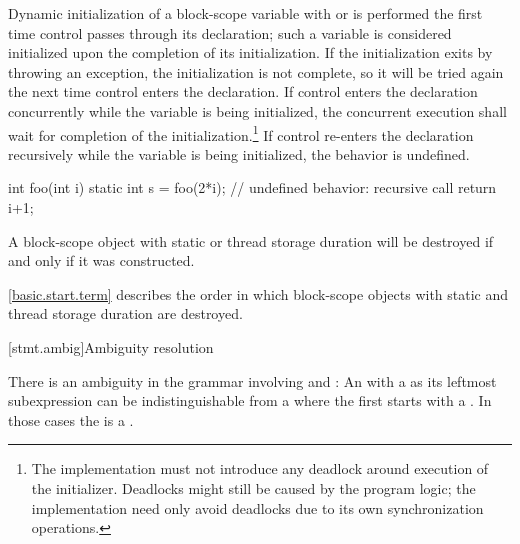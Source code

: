 \pnum
{}%
%
%
%
Dynamic initialization of a block-scope variable with
 or
 is performed
the first time control passes through its declaration; such a variable is
considered initialized upon the completion of its initialization. If the
initialization exits by throwing an exception, the initialization is not
complete, so it will be tried again the next time control enters the
declaration.
If control enters the declaration concurrently while the variable is
being initialized, the concurrent execution shall wait for completion
of the initialization.\footnote{The implementation must not introduce
any deadlock around execution of the initializer. Deadlocks might
still be caused by the program logic; the implementation need only
avoid deadlocks due to its own synchronization operations.} If control
re-enters the declaration recursively while
the variable is being initialized, the behavior is undefined.
\begin{example}
\begin{codeblock}
int foo(int i) {
  static int s = foo(2*i);      // undefined behavior: recursive call
  return i+1;
}
\end{codeblock}
\end{example}

\pnum
{}%
A block-scope object with static or thread storage duration will be
destroyed if and only if it was constructed.
\begin{note}
\ref{basic.start.term} describes the order in which block-scope objects with
static and thread storage duration are destroyed.
\end{note}

[stmt.ambig]{Ambiguity resolution}%

\pnum
There is an ambiguity in the grammar involving
 and : An
 with a  as its leftmost subexpression can be
indistinguishable from a  where the first
 starts with a \tcode{(}. In those cases the
 is a .


